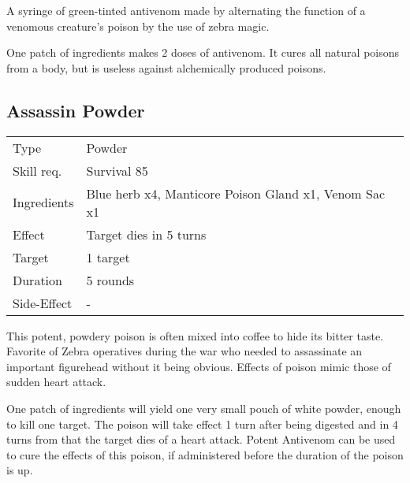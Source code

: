 \documentclass[11pt,a4paper,twocolumn]{book}
\begin{document}
\medskip

A syringe of green-tinted antivenom made by alternating the function of a venomous creature's poison by the use of zebra magic.

One patch of ingredients makes 2 doses of antivenom. It cures all natural poisons from a body, but is useless against alchemically produced poisons.

\vfill


\subsection*{Assassin Powder}
{
	\begin{tabu} to 75mm{| X[l,4] | X[l,8] |}
		\hline
		Type 			& Powder 													\\
		Skill req.	    & Survival 85 												\\
		Ingredients     & Blue herb x4, Manticore Poison Gland x1, Venom Sac x1		\\
		Effect     		& Target dies in 5 turns 									\\
		Target      	& 1 target													\\
		Duration  		& 5 rounds	 												\\
		Side-Effect     & -															\\ \hline
	\end{tabu}
	
}

\medskip

This potent, powdery poison is often mixed into coffee to hide its bitter taste. Favorite of Zebra operatives during the war who needed to assassinate an important figurehead without it being obvious. Effects of poison mimic those of sudden heart attack.

One patch of ingredients will yield one very small pouch of white powder, enough to kill one target.
The poison will take effect 1 turn after being digested and in 4 turns from that the target dies of a heart attack.
Potent Antivenom can be used to cure the effects of this poison, if administered before the duration of the poison is up.

\vfill
\end{document}
